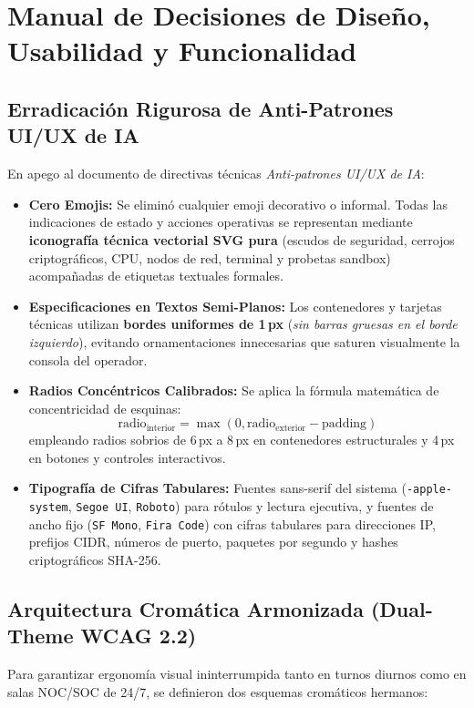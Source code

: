 \documentclass[11pt,a4paper]{article}
\begin{document}
\newpage

\section{Manual de Decisiones de Diseño, Usabilidad y Funcionalidad}

\subsection{Erradicación Rigurosa de Anti-Patrones UI/UX de IA}
En apego al documento de directivas técnicas \emph{Anti-patrones UI/UX de IA}:
\begin{itemize}[leftmargin=18bp, itemsep=4bp]
    \item \textbf{Cero Emojis:} Se eliminó cualquier emoji decorativo o informal. Todas las indicaciones de estado y acciones operativas se representan mediante \textbf{iconografía técnica vectorial SVG pura} (escudos de seguridad, cerrojos criptográficos, CPU, nodos de red, terminal y probetas sandbox) acompañadas de etiquetas textuales formales.
    \item \textbf{Especificaciones en Textos Semi-Planos:} Los contenedores y tarjetas técnicas utilizan \textbf{bordes uniformes de 1\,px} (\emph{sin barras gruesas en el borde izquierdo}), evitando ornamentaciones innecesarias que saturen visualmente la consola del operador.
    \item \textbf{Radios Concéntricos Calibrados:} Se aplica la fórmula matemática de concentricidad de esquinas:
    $$\text{radio}_{\text{interior}} = \max(0, \text{radio}_{\text{exterior}} - \text{padding})$$
    empleando radios sobrios de 6\,px a 8\,px en contenedores estructurales y 4\,px en botones y controles interactivos.
    \item \textbf{Tipografía de Cifras Tabulares:} Fuentes sans-serif del sistema (\texttt{-apple-system}, \texttt{Segoe UI}, \texttt{Roboto}) para rótulos y lectura ejecutiva, y fuentes de ancho fijo (\texttt{SF Mono}, \texttt{Fira Code}) con cifras tabulares para direcciones IP, prefijos CIDR, números de puerto, paquetes por segundo y hashes criptográficos SHA-256.
\end{itemize}

\subsection{Arquitectura Cromática Armonizada (Dual-Theme WCAG 2.2)}
Para garantizar ergonomía visual ininterrumpida tanto en turnos diurnos como en salas NOC/SOC de 24/7, se definieron dos esquemas cromáticos hermanos:
\end{document}
